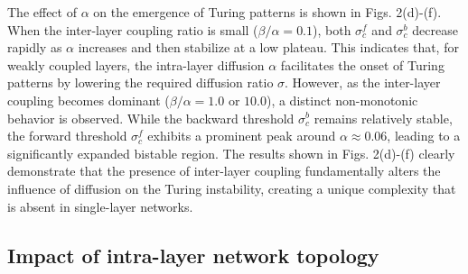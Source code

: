 \documentclass{SCIS2026}
\begin{document}
The effect of $\alpha$ on the emergence of Turing patterns is shown in Figs. 2(d)-(f).
When the inter-layer coupling ratio is small ($\beta/\alpha = 0.1$), both $\sigma_c^f$ and $\sigma_c^b$ decrease rapidly as $\alpha$ increases and then stabilize at a low plateau.
This indicates that, for weakly coupled layers, the intra-layer diffusion $\alpha$ facilitates the onset of Turing patterns by lowering the required diffusion ratio $\sigma$.
However, as the inter-layer coupling becomes dominant ($\beta/\alpha = 1.0$ or $10.0$), a distinct non-monotonic behavior is observed.
While the backward threshold $\sigma_c^b$ remains relatively stable, the forward threshold $\sigma_c^f$ exhibits a prominent peak around $\alpha \approx 0.06$, leading to a significantly expanded bistable region.
The results shown in Figs. 2(d)-(f) clearly demonstrate that the presence of inter-layer coupling fundamentally alters the influence of diffusion on the Turing instability, creating a unique complexity that is absent in single-layer networks.



\subsection{Impact of intra-layer network topology}
\end{document}
